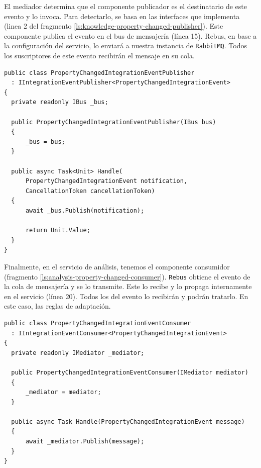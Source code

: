 El mediador determina que el componente publicador es el destinatario de este evento y lo invoca. Para detectarlo, se basa en las interfaces que implementa (linea 2 del fragmento \ref{ls:knowledge-property-changed-publisher}). Este componente publica el evento en el bus de mensajería (línea 15). Rebus, en base a la configuración del servicio, lo enviará a nuestra instancia de \texttt{RabbitMQ}. Todos los suscriptores de este evento recibirán el mensaje en su cola.

\begin{lstlisting}[language={[Sharp]C},caption={El publicador de eventos captura el evento de integración y lo publica en el bus.},captionpos=b, label=ls:knowledge-property-changed-publisher]
public class PropertyChangedIntegrationEventPublisher
  : IIntegrationEventPublisher<PropertyChangedIntegrationEvent>
{
  private readonly IBus _bus;

  public PropertyChangedIntegrationEventPublisher(IBus bus)
  {
      _bus = bus;
  }

  public async Task<Unit> Handle(
      PropertyChangedIntegrationEvent notification,
      CancellationToken cancellationToken)
  {
      await _bus.Publish(notification);

      return Unit.Value;
  }
}
\end{lstlisting}

Finalmente, en el servicio de análisis, tenemos el componente consumidor (fragmento \ref{ls:analysis-property-changed-consumer}). \texttt{Rebus} obtiene el evento de la cola de mensajería y se lo transmite. Este lo recibe y lo propaga internamente en el servicio (línea 20). Todos los  del evento lo recibirán y podrán tratarlo. En este caso, las reglas de adaptación.

\begin{lstlisting}[language={[Sharp]C},caption={El consumidor recibe el evento de integración del bus y lo propaga internamente. Todos los \foreign{english}{handlers} de este evento lo recibirán.},captionpos=b, label=ls:analysis-property-changed-consumer]
public class PropertyChangedIntegrationEventConsumer
  : IIntegrationEventConsumer<PropertyChangedIntegrationEvent>
{
  private readonly IMediator _mediator;

  public PropertyChangedIntegrationEventConsumer(IMediator mediator)
  {
      _mediator = mediator;
  }

  public async Task Handle(PropertyChangedIntegrationEvent message)
  {
      await _mediator.Publish(message);
  }
}
\end{lstlisting}

